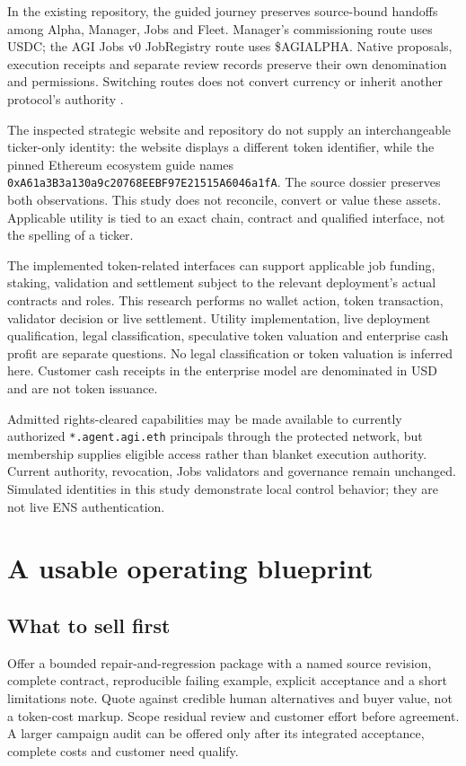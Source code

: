 \documentclass[11pt,letterpaper]{article}
\begin{document}
In the existing repository, the guided journey preserves source-bound handoffs among Alpha, Manager, Jobs and Fleet. Manager's commissioning route uses USDC; the AGI Jobs v0 JobRegistry route uses \$AGIALPHA. Native proposals, execution receipts and separate review records preserve their own denomination and permissions. Switching routes does not convert currency or inherit another protocol's authority \cite{journey}.

The inspected strategic website and repository do not supply an interchangeable ticker-only identity: the website displays a different token identifier, while the pinned Ethereum ecosystem guide names \texttt{0xA61a3B3a130a9c20768EEBF97E21515A6046a1fA}. The source dossier preserves both observations. This study does not reconcile, convert or value these assets. Applicable utility is tied to an exact chain, contract and qualified interface, not the spelling of a ticker.

The implemented token-related interfaces can support applicable job funding, staking, validation and settlement subject to the relevant deployment's actual contracts and roles. This research performs no wallet action, token transaction, validator decision or live settlement. Utility implementation, live deployment qualification, legal classification, speculative token valuation and enterprise cash profit are separate questions. No legal classification or token valuation is inferred here. Customer cash receipts in the enterprise model are denominated in USD and are not token issuance.

Admitted rights-cleared capabilities may be made available to currently authorized \texttt{*.agent.agi.eth} principals through the protected network, but membership supplies eligible access rather than blanket execution authority. Current authority, revocation, Jobs validators and governance remain unchanged. Simulated identities in this study demonstrate local control behavior; they are not live ENS authentication.

\section{A usable operating blueprint}
\subsection{What to sell first}
Offer a bounded repair-and-regression package with a named source revision, complete contract, reproducible failing example, explicit acceptance and a short limitations note. Quote against credible human alternatives and buyer value, not a token-cost markup. Scope residual review and customer effort before agreement. A larger campaign audit can be offered only after its integrated acceptance, complete costs and customer need qualify.
\end{document}
